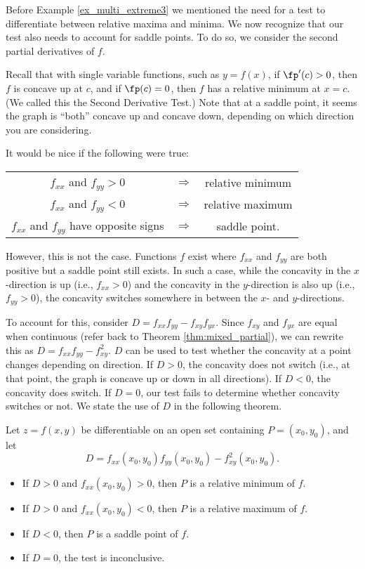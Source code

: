 Before Example \ref{ex_multi_extreme3} we mentioned the need for a test to differentiate between relative maxima and minima. We now recognize that our test also needs to account for saddle points. To do so, we consider the second partial derivatives of $f$.

Recall that with single variable functions, such as $y=f(x)$, if $\fp'(c)>0$, then $f$ is concave up at $c$, and if $\fp(c) =0$, then $f$ has a relative minimum at $x=c$. (We called this the Second Derivative Test.) Note that at a saddle point, it seems the graph is ``both'' concave up and concave down, depending on which direction you are considering.

It would be nice if the following were true:
\begin{center}
	\begin{tabular}{ccc}
	$f_{xx}$ and $f_{yy} >0$ & $\Rightarrow$ & relative minimum\\
	$f_{xx}$ and $f_{yy} <0$ & $\Rightarrow$ & relative maximum\\
	$f_{xx}$ and $f_{yy}$ have opposite signs & $\Rightarrow$ & saddle point.
	\end{tabular}
\end{center}

However, this is not the case. Functions $f$ exist where $f_{xx}$ and $f_{yy}$ are both positive  but a saddle point still exists. In such a case, while the concavity in the $x$-direction is up (i.e., $f_{xx}>0$) and the concavity in the $y$-direction is also up (i.e., $f_{yy}>0$), the concavity switches somewhere in between the $x$- and $y$-directions.

To account for this, consider $D = f_{xx}f_{yy}-f_{xy}f_{yx}$. Since $f_{xy}$ and $f_{yx}$ are equal when continuous (refer back to Theorem \ref{thm:mixed_partial}), we can rewrite this as $D = f_{xx}f_{yy}-f_{xy}^2$. $D$ can be used to test whether the concavity at a point changes depending on direction. If $D>0$, the concavity does not switch (i.e., at that point, the graph is concave up or down in all directions). If $D<0$, the concavity does switch. If $D=0$, our test fails to determine whether concavity switches or not. We state the use of $D$ in the following theorem.

{Let $z=f(x,y)$ be differentiable on an open set containing $P = (x_0,y_0)$, and let 
$$D = f_{xx}(x_0,y_0)f_{yy}(x_0,y_0)-f_{xy}^2(x_0,y_0).$$
\begin{itemize}
	\item If $D>0$ and $f_{xx}(x_0,y_0)>0$, then $P$ is a relative minimum of $f$.
	\item If $D>0$ and $f_{xx}(x_0,y_0)<0$, then $P$ is a relative maximum of $f$.
	\item	If $D<0$, then $P$ is a saddle point of $f$.
	\item If $D=0$, the test is inconclusive.
\end{itemize}
}

